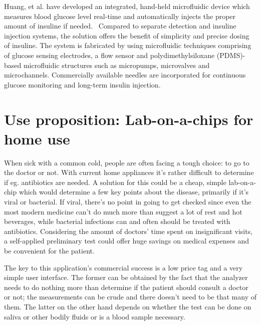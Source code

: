 \documentclass[12pt]{article}
\begin{document}
Huang, et al. have developed an integrated, hand-held microfluidic device which measures blood glucose level
real-time and automatically injects the proper amount of insuline if needed.~\cite{HUANG_2006} Compared to separate detection 
and insuline injection systems, the solution offers the benefit of simplicity and precise dosing of insuline.
The system is fabricated by using microfluidic techniques comprising of glucose sensing electrodes, a flow sensor and
polydimethylsiloxane (PDMS)-based microfluidic structures such as micropumps, microvalves and microchannels. Commercially 
available needles are incorporated for continuous glucose monitoring and long-term insulin injection.

\section{Use proposition: Lab-on-a-chips for home use}

When sick with a common cold, people are often facing a tough choice: to go to the doctor or not. With current home
appliances it's rather difficult to determine if eg. antibiotics are needed. A solution for this
could be a cheap, simple lab-on-a-chip which would determine a few key points about the disease,
primarily if it's viral or bacterial. If viral, there's no point in going to get checked 
since even the most modern medicine can't do much more than suggest a lot of rest and hot beverages, while
bacterial infections can and often should be treated with antibiotics. Considering the amount of doctors' 
time spent on insignificant visits, a self-applied preliminary test could offer huge savings on medical 
expenses and be convenient for the patient.

The key to this application's commercial success is a low price tag and a very simple user interface.
The former can be obtained by the fact that the analyzer needs to do nothing more than determine if
the patient should consult a doctor or not; the measurements can be crude and there doesn't need to be that 
many of them. The latter on the other hand depends on whether the test can be done on saliva or other
bodily fluids or is a blood sample necessary.


\end{document}
